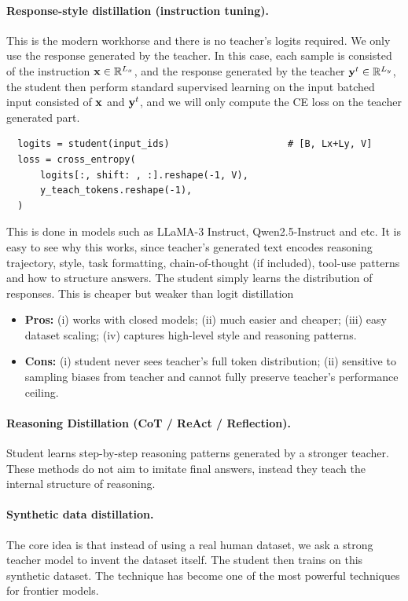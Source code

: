\documentclass[11pt]{article}  %
\begin{document}
\paragraph{Response-style distillation (instruction tuning).}
This is the modern workhorse and there is no teacher's logits required.
We only use the response generated by the teacher.
In this case, each sample is consisted of the instruction $\mathbf{x} \in \mathbb{R}^{L_x}$, and the response generated by the teacher $\mathbf{y}^t \in \mathbb{R}^{L_y}$,  the student then perform standard supervised learning on the input batched input consisted of $\mathbf{x}$ and $\mathbf{y}^t$, and we will only compute the CE loss on the teacher generated part.

\begin{lstlisting}
  logits = student(input_ids)                     # [B, Lx+Ly, V]
  loss = cross_entropy(
      logits[:, shift: , :].reshape(-1, V),
      y_teach_tokens.reshape(-1),
  )
\end{lstlisting}
This is done in models such as LLaMA-3 Instruct, Qwen2.5-Instruct and etc.
It is easy to see why this works, since teacher's generated text encodes reasoning trajectory, style, task formatting, chain-of-thought (if included), tool-use patterns and how to structure answers.
The student simply learns the distribution of responses.
This is cheaper but weaker than logit distillation
\begin{itemize}
  \item \textbf{Pros:} (i) works with closed models; (ii) much easier and cheaper; (iii) easy dataset scaling; (iv) captures high-level style and reasoning patterns.
  \item \textbf{Cons:} (i) student never sees teacher's full token distribution; (ii) sensitive to sampling biases from teacher and cannot fully preserve teacher's performance ceiling.
\end{itemize}


\paragraph{Reasoning Distillation (CoT / ReAct / Reflection).}
Student learns step-by-step reasoning patterns generated by a stronger teacher.
These methods do not aim to imitate final answers, instead they teach the internal structure of reasoning.

\paragraph{Synthetic data distillation.}
The core idea is that instead of using a real human dataset, we ask a strong teacher model to invent the dataset itself.
The student then trains on this synthetic dataset.
The technique has become one of the most powerful techniques for frontier models.
\end{document}
